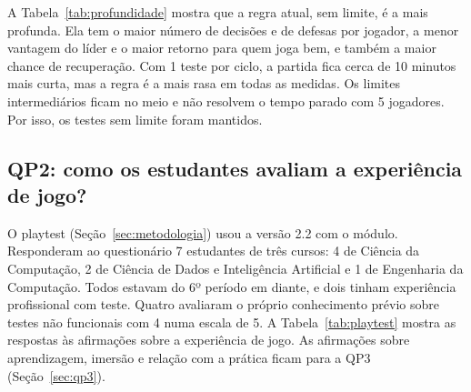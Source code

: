 A Tabela~\ref{tab:profundidade} mostra que a regra atual, sem limite, é a mais profunda. Ela tem o maior número
de decisões e de defesas por jogador, a menor vantagem do líder e o maior retorno para quem joga bem, e também a
maior chance de recuperação. Com 1 teste por ciclo, a partida fica cerca de 10 minutos mais curta, mas a regra é a
mais rasa em todas as medidas. Os limites intermediários ficam no meio e não resolvem o tempo parado com 5
jogadores. Por isso, os testes
sem limite foram mantidos. 

\subsection{QP2: como os estudantes avaliam a experiência de jogo?}
\label{sec:qp2}

O playtest (Seção~\ref{sec:metodologia}) usou a versão 2.2 com o módulo. Responderam ao questionário 7 estudantes
de três cursos: 4 de Ciência da Computação, 2 de Ciência de Dados e Inteligência Artificial e 1 de Engenharia da
Computação. Todos estavam do 6º período em diante, e dois tinham experiência profissional com teste. Quatro
avaliaram o próprio conhecimento prévio sobre testes não funcionais com 4 numa escala de 5. A
Tabela~\ref{tab:playtest} mostra as respostas às afirmações sobre a experiência de jogo. As afirmações sobre
aprendizagem, imersão e relação com a prática ficam para a QP3 (Seção~\ref{sec:qp3}).

